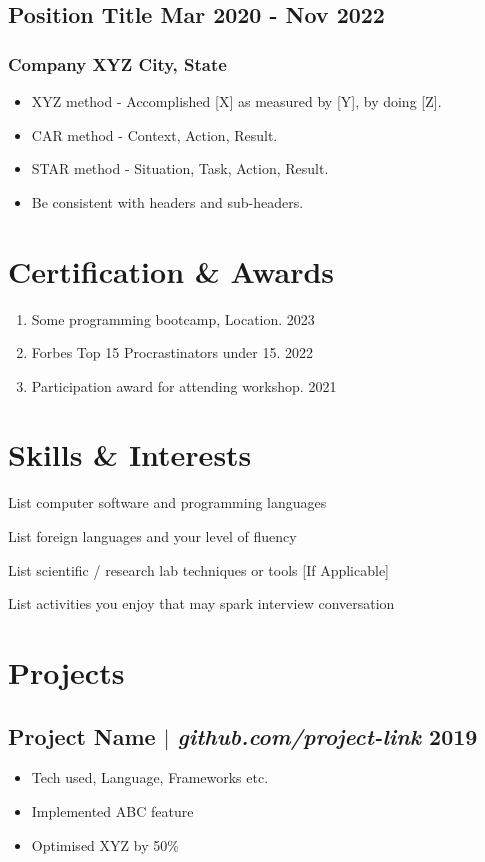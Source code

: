 \documentclass[11pt]{article} %
\begin{document}
\subsection{Position Title \hfill Mar 2020 - Nov 2022}
\subsubsection{Company XYZ \hfill City, State}
\begin{itemize}
	\item XYZ method - Accomplished [X] as measured by [Y], by doing [Z].
	\item CAR method - Context, Action, Result. 
	\item STAR method - Situation, Task, Action, Result.
	\item Be consistent with headers and sub-headers. 
\end{itemize}

\section{Certification \& Awards}
\begin{enumerate}[label=\null, left=0pt..0pt, itemsep=0pt]
	\item Some programming bootcamp, Location. \hfill 2023
	\item Forbes Top 15 Procrastinators under 15. \hfill 2022
	\item Participation award for attending workshop. \hfill 2021
\end{enumerate}

\section{Skills \& Interests}
\begin{description}[itemsep=0pt]
	\item[Technical] List computer software and programming languages
	\item[Language] List foreign languages and your level of fluency
	\item[Laboratory] List scientific / research lab techniques or tools [If Applicable]
	\item[Interests] List activities you enjoy that may spark interview conversation
\end{description}

\section{Projects}
\subsection{Project Name $|$ \normalfont\textit{github.com/project-link} \hfill 2019}
\begin{itemize}
  \item Tech used, Language, Frameworks etc.
  \item Implemented ABC feature
  \item Optimised XYZ by 50\%
\end{itemize}
\end{document}
